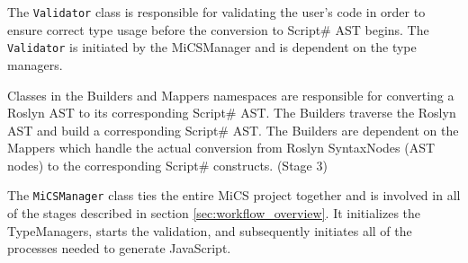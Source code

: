 The \texttt{Validator} class is responsible for validating the user's code in order to ensure correct type usage before the conversion to Script\# AST begins. The \texttt{Validator} is initiated by the MiCSManager and is dependent on the type managers.

Classes in the Builders and Mappers namespaces are responsible for converting a Roslyn AST to its corresponding Script\# AST. The Builders traverse the Roslyn AST and build a corresponding Script\# AST. The Builders are dependent on the Mappers which handle the actual conversion from Roslyn SyntaxNodes (AST nodes) to the corresponding Script\# constructs. (Stage 3)

The \texttt{MiCSManager} class ties the entire MiCS project together and is involved in all of the stages described in section \ref{sec:workflow_overview}. It initializes the TypeManagers, starts the validation, and subsequently initiates all of the processes needed to generate JavaScript. 


